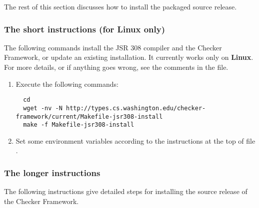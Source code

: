 The rest of this section discusses how to install the packaged source release.


\subsubsection{The short instructions (for Linux only)}


The following commands install
the JSR 308  compiler and the Checker
Framework, or update an existing installation.
It currently works only on \textbf{Linux}.
For more details, or if anything goes wrong, see the comments in the 
 file.

\begin{enumerate}

\item
  Execute the following commands:

\begin{Verbatim}
  cd
  wget -nv -N http://types.cs.washington.edu/checker-framework/current/Makefile-jsr308-install
  make -f Makefile-jsr308-install
\end{Verbatim}

\item
Set some environment variables according to the instructions at the top of file
.

\end{enumerate}


\subsubsection{The longer instructions}

The following instructions give detailed steps for installing the source
release of the Checker Framework.

